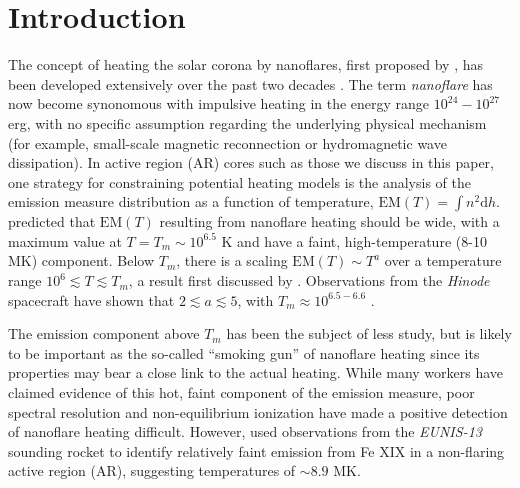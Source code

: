 \documentclass[preprint,linenumbers]{aastex}
\begin{document}
	\section{Introduction}
	\label{sec:intro}
	\par{}
	\par The concept of heating the solar corona by nanoflares, first proposed by \citet{parker_nanoflares_1988}, has been developed extensively over the past two decades \citep[e.g.][]{cargill_implications_1994,cargill_nanoflare_2004,klimchuk_solving_2006}. The term \textit{nanoflare} has now become synonomous with impulsive heating in the energy range $10^{24}-10^{27}$ erg, with no specific assumption regarding the underlying physical mechanism (for example, small-scale magnetic reconnection or hydromagnetic wave dissipation).
	In active region (AR) cores such as those we discuss in this paper, one strategy for constraining potential heating models is the analysis of the emission measure distribution as a function of temperature, $\mathrm{EM}(T)=\int n^2\mathrm{d}h$. \citet{cargill_implications_1994,cargill_nanoflare_2004} predicted that $\mathrm{EM}(T)$ resulting from nanoflare heating should be wide, with a maximum value at $T=T_m\sim10^{6.5}$ K and have a faint, high-temperature (8-10 MK) component. Below $T_m$, there is a scaling $\mathrm{EM}(T)\sim T^a$ over a temperature range $10^6\lesssim T\lesssim T_m$, a result first discussed by \citet{jordan_structure_1975}. Observations from the \textit{Hinode} spacecraft \citep{kosugi_hinode_2007} have shown that $2\lesssim a\lesssim5$, with $T_m\approx10^{6.5-6.6}$ \citep{warren_constraints_2011,warren_systematic_2012,winebarger_using_2011,tripathi_emission_2011,schmelz_cold_2012,del_zanna_evolution_2015}.
	\par The emission component above $T_m$ has been the subject of less study, but is likely to be important as the so-called ``smoking gun'' of nanoflare heating since its properties may bear a close link to the actual heating. While many workers \citep{reale_evidence_2009,schmelz_hinode_2009,miceli_x-ray_2012,testa_hinode/eis_2012,del_zanna_elemental_2014,petralia_thermal_2014,schmelz_hot_2015} have claimed evidence of this hot, faint component of the emission measure, poor spectral resolution \citep{testa_temperature_2011,winebarger_defining_2012} and non-equilibrium ionization \citep{bradshaw_explosive_2006,reale_nonequilibrium_2008} have made a positive detection of nanoflare heating difficult. However, \citet{brosius_pervasive_2014} used observations from the \textit{EUNIS-13} sounding rocket to identify relatively faint emission from Fe XIX in a non-flaring active region (AR), suggesting temperatures of $\sim8.9$ MK.
\end{document}

